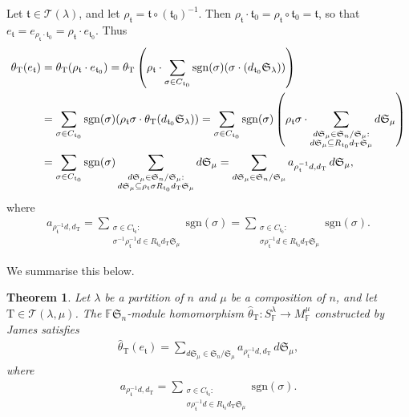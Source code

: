 \documentclass[11pt]{article}
\newtheorem{Theorem}{Theorem}[section]
\renewcommand{\t}{\mathfrak{t}}
\newcommand{\TT}{\mathscr{T}}
\newcommand{\T}{\mathrm{T}}
\newcommand{\sgn}{\mathrm{sgn}}
\newcommand{\sym}[1]{\mathfrak{S}_{#1}}
\newcommand{\F}{\mathbb{F}}
\begin{document}
Let $\t \in \TT(\lambda)$, and let $\rho_{\t} = \t \circ (\t_0)^{-1}$. Then $\rho_{\t} \cdot \t_0 = \rho_{\t} \circ \t_0 = \t$, so that $e_{\t} = e_{\rho_{\t} \cdot \t_0} = \rho_{\t} \cdot e_{\t_0}$. Thus
\begin{align*}\allowdisplaybreaks
\theta_{\T}(e_{\t}) &= \theta_{\T}(\rho_{\t} \cdot e_{\t_0})
= \theta_{\T}\left (\rho_{\t} \cdot \sum_{\sigma \in C_{\t_0}} \sgn(\sigma) (\sigma \cdot (d_{\t_0} \sym{\lambda}))\right ) \\
&= \sum_{\sigma \in C_{\t_0}} \sgn(\sigma) (\rho_{\t} \sigma \cdot \theta_{\T}(d_{\t_0} \sym{\lambda}))
= \sum_{\sigma \in C_{\t_0}} \sgn(\sigma) \left(\rho_{\t}\sigma \cdot \sum_{\substack{d\sym{\mu} \in \sym{n}/\sym{\mu} : \\ d\sym{\mu} \subseteq R_{\t_0} d_\T \sym{\mu}}} d \sym{\mu} \right) \\
&= \sum_{\sigma \in C_{\t_0}} \sgn(\sigma) \sum_{\substack{d\sym{\mu} \in \sym{n}/\sym{\mu} : \\ d\sym{\mu} \subseteq \rho_{\t} \sigma R_{\t_0} d_\T \sym{\mu}}} d \sym{\mu}
= \sum_{d \sym{\mu} \in \sym{n}/\sym{\mu}} a_{\rho_\t^{-1}d,d_\T} \, d\sym{\mu},
\end{align*}where
\begin{gather*}
a_{\rho_\t^{-1}d,d_\T}= \sum_{\substack{\sigma \in C_{\t_0} : \\ \sigma^{-1} \rho_{\t}^{-1} d \in R_{\t_0} d_{\T} \sym{\mu}}} \sgn(\sigma) =
\sum_{\substack{\sigma \in C_{\t_0} : \\ \sigma \rho_{\t}^{-1} d \in R_{\t_0} d_{\T} \sym{\mu}}} \sgn(\sigma).
\end{gather*}

We summarise this below.

\begin{Theorem} \label{T:JamesTheta}
Let $\lambda$ be a partition of $n$ and $\mu$ be a composition of $n$, and
let $\T \in \TT(\lambda,\mu)$.
The $\F\sym{n}$-module homomorphism $\hat{\theta}_{\T} \colon S_\F^{\lambda} \to M_\F^{\mu}$ constructed by James satisfies
\begin{gather*}
\hat{\theta}_{\T}(e_{\t}) = \sum_{d \sym{\mu} \in \sym{n}/\sym{\mu}} a_{\rho_\t^{-1}d,d_\T} \, d\sym{\mu},
\end{gather*} where
\begin{gather*}
a_{\rho_\t^{-1}d,d_\T} = \sum_{\substack{\sigma \in C_{\t_0} : \\ \sigma \rho_{\t}^{-1} d \in R_{\t_0} d_{\T} \sym{\mu}}} \sgn(\sigma).
\end{gather*}
\end{Theorem}
\end{document}
